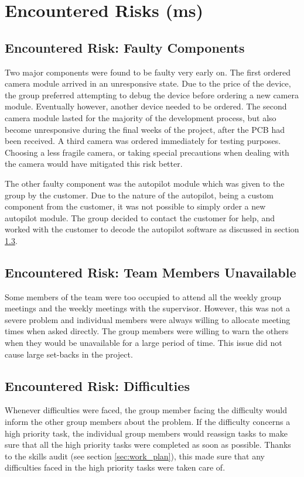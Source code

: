 \section{Encountered Risks (ms)}
\label{encountered risks}

\subsection{Encountered Risk: Faulty Components}
Two major components were found to be faulty very early on. 
The first ordered camera module  
arrived in an unresponsive state. 
Due to the price of the device, 
the group preferred attempting to debug the device before 
ordering a new camera module. 
Eventually however, another device needed to be ordered. 
The second camera module lasted for the majority of 
the development process, but also 
become unresponsive during the final weeks of the project,
after the PCB had been received. 
A third camera was ordered immediately for testing purposes.
Choosing a less fragile camera, or taking special precautions
when dealing with the camera would have mitigated this risk better.

The other faulty component was the autopilot module which 
was given to the group by the customer. 
Due to the nature of the autopilot, being a custom component 
from the customer, it was not possible to simply 
order a new autopilot module. 
The group decided to contact the customer for help, and 
worked with the customer to decode the autopilot software 
as discussed in section \ref{}.

\subsection{Encountered Risk: Team Members Unavailable}
Some members of the team were too occupied to attend 
all the weekly group meetings and 
the weekly meetings with the supervisor. 
However, this was not a severe problem and individual 
members were always willing to allocate 
meeting times when asked directly. 
The group members were willing to warn the others 
when they would be unavailable for a large period of time. 
This issue did not cause large set-backs in the project.

\subsection{Encountered Risk: Difficulties}
Whenever difficulties were faced, the group member 
facing the difficulty would inform the other 
group members about the problem. 
If the difficulty concerns a high priority task, 
the individual group members would reassign 
tasks to make sure that all the high priority 
tasks were completed as soon as possible. 
Thanks to the skills audit (see section \ref{sec:work_plan}), this made sure that 
any difficulties faced in the high priority 
tasks were taken care of. 